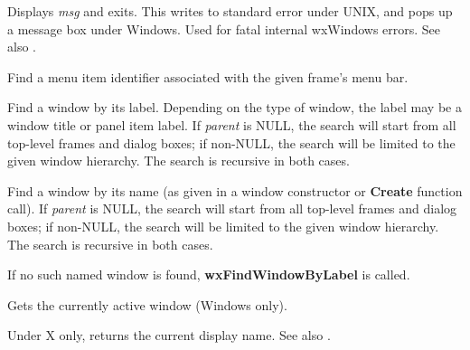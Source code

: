 
Displays {\it msg} and exits. This writes to standard error under UNIX,
and pops up a message box under Windows. Used for fatal internal
wxWindows errors. See also .



Find a menu item identifier associated with the given frame's menu bar.



Find a window by its label. Depending on the type of window, the label may be a window title
or panel item label. If {\it parent} is NULL, the search will start from all top-level
frames and dialog boxes; if non-NULL, the search will be limited to the given window hierarchy.
The search is recursive in both cases.

\label{wxfindwindowbyname}


Find a window by its name (as given in a window constructor or {\bf Create} function call).
If {\it parent} is NULL, the search will start from all top-level
frames and dialog boxes; if non-NULL, the search will be limited to the given window hierarchy.
The search is recursive in both cases.

If no such named window is found, {\bf wxFindWindowByLabel} is called.

\label{wxgetactivewindow}


Gets the currently active window (Windows only).

\label{wxgetdisplayname}


Under X only, returns the current display name. See also .


